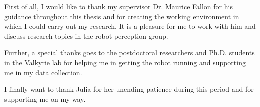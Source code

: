 \begin{acknowledgements}      

First of all, I would like to thank my supervisor Dr. Maurice Fallon for his guidance throughout this thesis and for creating the working environment in which I could carry out my research. It is a pleasure for me to work with him and discuss research topics in the robot perception group.

Further, a special thanks goes to the postdoctoral researchers and Ph.D. students in the Valkyrie lab for helping me in getting the robot running and supporting me in my data collection.

I finally want to thank Julia for her unending patience during this period and for supporting me on my way.

\end{acknowledgements}